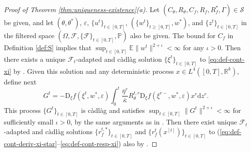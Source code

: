 \documentclass[11pt,letterpaper,reqno]{amsart}
\theoremstyle{definition}
\def\eps{\varepsilon}
\def\d{\mathrm{d}}
\def\D{\mathrm{D}}
\def\P{\mathbb{P}}
\def\E{\mathbb{E}}
\def\R{\mathbb{R}}
\def\cS{\mathcal{S}}
\def\cF{\mathcal{F}}
\begin{document}
\begin{proof}[Proof of Theorem \ref{thm:uniqueness-existence}(a)]
Let $(C_\theta,R_\theta,C_f,R_f,R_f^*,\Gamma) \in \cS$ be given, and let
$(\theta,\theta^*)$, $\eps$, $\{u^t\}_{t \in [0,T]}$, $(\{w^t\}_{t \geq
[0,T]},w^*)$, and $\{z^t\}_{t \in [0,T]}$ in the filtered space
$(\Omega,\cF,\{\cF\}_{t \in [0,T]},\P)$ also be given. The bound for
$C_f$ in Definition \ref{def:S} implies that $\sup_{t \in [0,T]} \E\|w^t\|^{2+\iota}<\infty$ for any $\iota>0$.
Then there exists a unique $\cF_t$-adapted and c\`adl\`ag
solution $\{\xi^t\}_{t \in [0,T]}$ to \eqref{eq:def-cont-xi} by
. Given this solution and any
deterministic process $x \in L^4([0,T],\R^k)$, define next
\[G^t={-}\D_\xi
f(\xi^t,w^*,\eps)\int_0^t \frac{\bar\eta^r}{\bar\kappa}R_\theta^{t,r}
\D_\xi f(\xi^{r-},w^*,\eps)x^r \d z^r.\]
This process $\{G^t\}_{t \in [0,T]}$ is c\`adl\`ag and satisfies $\sup_{t \in [0,T]}\|G^t\|^{2+\iota}<\infty$ for
sufficiently small $\iota>0$, by
the same arguments as in .
Then there exist unique $\cF_t$-adapted and c\`adl\`ag solutions
$\{r_f^{t,*}\}_{t \in [0,T]}$ and
$\{r_f^t(x^{[t]})\}_{t \in [0,T]}$ to
(\ref{eq:def-cont-deriv-xi-star}--\ref{eq:def-cont-resp-xi})
also by .


\end{proof}
\end{document}
